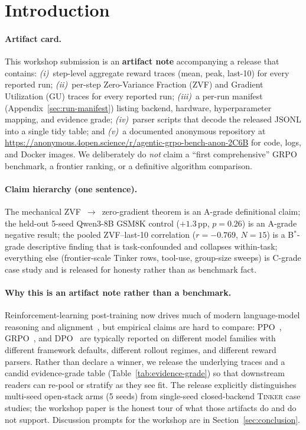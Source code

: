 \documentclass{article}
\newcommand{\tinker}{\textsc{Tinker}}
\begin{document}
\section{Introduction}
\label{sec:intro}

\paragraph{Artifact card.}
This workshop submission is an \textbf{artifact note} accompanying a release
that contains: \textit{(i)}~step-level aggregate reward traces (mean, peak,
last-10) for every reported run; \textit{(ii)}~per-step Zero-Variance
Fraction (ZVF) and Gradient Utilization (GU) traces for every reported run;
\textit{(iii)}~a per-run manifest (Appendix~\ref{sec:run-manifest}) listing
backend, hardware, hyperparameter mapping, and evidence grade;
\textit{(iv)}~parser scripts that decode the released JSONL into a single
tidy table; and \textit{(v)}~a documented anonymous repository at
\url{https://anonymous.4open.science/r/agentic-grpo-bench-anon-2C6B} for
code, logs, and Docker images. We deliberately do \emph{not} claim a
``first comprehensive'' GRPO benchmark, a frontier ranking, or a definitive
algorithm comparison.

\paragraph{Claim hierarchy (one sentence).}
The mechanical ZVF~$\to$~zero-gradient theorem is an A-grade definitional
claim; the held-out 5-seed Qwen3-8B GSM8K control ($+1.3\,$pp,
$p{=}0.26$) is an A-grade negative result; the pooled ZVF--last-10
correlation ($r{=}{-}0.769$, $N{=}15$) is a B$^{*}$-grade descriptive
finding that is task-confounded and collapses within-task; everything
else (frontier-scale Tinker rows, tool-use, group-size sweeps) is C-grade
case study and is released for honesty rather than as benchmark fact.

\paragraph{Why this is an artifact note rather than a benchmark.}
Reinforcement-learning post-training now drives much of modern language-model
reasoning and alignment~\citep{ouyang2022training,guo2025deepseekr1nature},
but empirical claims are hard to compare:
PPO~\citep{schulman2017proximal}, GRPO~\citep{shao2024deepseekmath}, and
DPO~\citep{rafailov2024direct} are typically reported on different model
families with different framework defaults, different rollout regimes, and
different reward parsers. Rather than declare a winner, we release the
underlying traces and a candid evidence-grade table
(Table~\ref{tab:evidence-grade}) so that downstream readers can re-pool
or stratify as they see fit. The release explicitly distinguishes
multi-seed open-stack arms (5 seeds) from single-seed closed-backend
\tinker{} case studies; the workshop paper is the honest tour of what those
artifacts do and do not support. Discussion prompts for the workshop are
in Section~\ref{sec:conclusion}.
 
\end{document}
